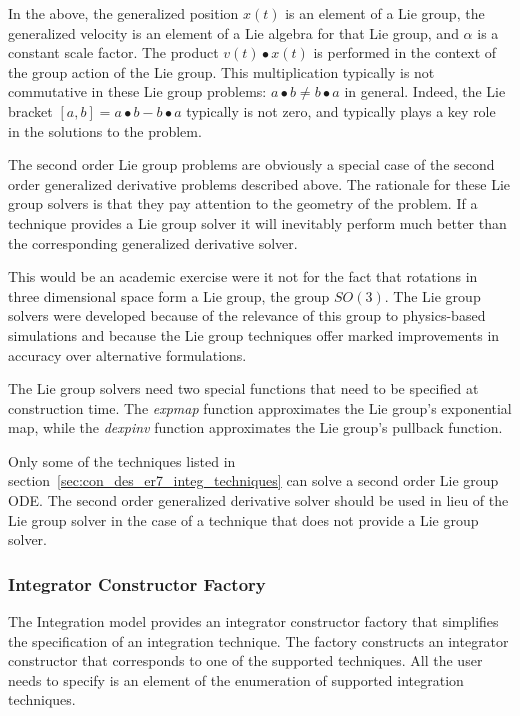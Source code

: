 In the above, the generalized position $x(t)$ is an element of a Lie group, the
generalized velocity is an element of a Lie algebra for that Lie group, and
$\alpha$ is a constant scale factor. The product $v(t) \bullet x(t)$ is
performed in the context of the group action of the Lie group.
This multiplication typically is not commutative in these Lie group problems:
$a \bullet b \ne b \bullet a$ in general. Indeed, the Lie bracket
$[a,b] = a \bullet b - b \bullet a$ typically is not zero, and typically plays
a key role in the solutions to the problem.

The second order Lie group problems are obviously a special case of the second
order generalized derivative problems described above. The rationale for these
Lie group solvers is that they pay attention to the geometry of the problem.
If a technique provides a Lie group solver it will inevitably perform much
better than the corresponding generalized derivative solver.

This would be an academic exercise were it not for the fact that rotations in
three dimensional space form a Lie group, the group $SO(3)$. The Lie group
solvers were developed because of the relevance of this group to physics-based
simulations and because the Lie group techniques offer marked improvements in
accuracy over alternative formulations.

The Lie group solvers need two special functions that need to be specified at
construction time. The \emph{expmap} function approximates the Lie group's
exponential map, while the \emph{dexpinv} function approximates the Lie group's
pullback function.

Only some of the techniques listed in
section~\ref{sec:con_des_er7_integ_techniques}
can solve a second order Lie group ODE. The second order generalized derivative
solver should be used in lieu of the Lie group solver in the case of a technique
that does not provide a Lie group solver.

\subsubsection{Integrator Constructor Factory}

The \erseven Integration model provides an integrator constructor factory
that simplifies the specification of an integration technique. The factory
constructs an integrator constructor that corresponds to one of the supported
techniques. All the user needs to specify is an element of the enumeration
of supported integration techniques.

